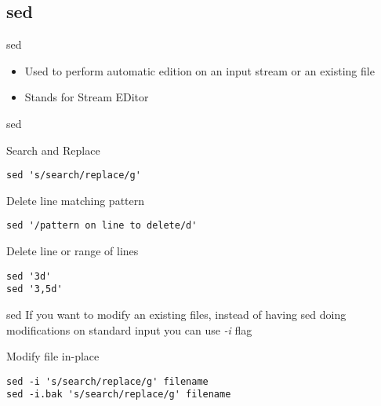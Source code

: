 \subsection{sed}

\begin{frame}[fragile]{sed}
  \begin{itemize}
    \item Used to perform automatic edition on an input stream or an existing file
    \pause
    \item Stands for Stream EDitor
  \end{itemize}
\end{frame}

\begin{frame}[fragile]{sed}
  \begin{exampleblock}{Search and Replace}
    \begin{lstlisting}[showstringspaces=false,basicstyle=\tiny]
sed 's/search/replace/g'
    \end{lstlisting}
  \end{exampleblock}
  \pause

  \begin{exampleblock}{Delete line matching pattern}
    \begin{lstlisting}[showstringspaces=false,basicstyle=\tiny]
sed '/pattern on line to delete/d'
    \end{lstlisting}
  \end{exampleblock}
  \pause

  \begin{exampleblock}{Delete line or range of lines}
    \begin{lstlisting}[showstringspaces=false,basicstyle=\tiny]
sed '3d'
sed '3,5d'
    \end{lstlisting}
  \end{exampleblock}
\end{frame}

\begin{frame}[fragile]{sed}
If you want to modify an existing files, instead of having sed doing modifications on standard input you can use \emph{-i} flag
\pause
  \begin{exampleblock}{Modify file in-place}
    \begin{lstlisting}[showstringspaces=false,basicstyle=\tiny]
sed -i 's/search/replace/g' filename
sed -i.bak 's/search/replace/g' filename
    \end{lstlisting}
  \end{exampleblock}
\end{frame}

